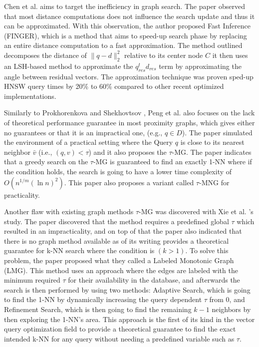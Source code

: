 \documentclass[conference]{IEEEtran}
\begin{document}
Chen et al. \cite{chen2023} aims to target the inefficiency in graph search. The paper observed that most distance computations does not influence the search update and thus it can be approximated. With this observation, the author proposed Fast Inference (FINGER), which is a method that aims to speed-up search phase by replacing an entire distance computation to a fast approximation. The method outlined decomposes the distance of $\|q-d\|_2^2$ relative to its center node $C$ it then uses an LSH-based method to approximate the $q_{res}^t d_{res}$ term by approximating the angle between residual vectors. The approximation technique was proven sped-up HNSW query times by 20\% to 60\% compared to other recent optimized implementations.

Similarly to Prokhorenkova and Shekhovtsov \cite{prokhorenkova2020}, Peng et al. \cite{peng2023} also focuses on the lack of theoretical performance guarantee in most proximity graphs, which gives either no guarantees or that it is an impractical one, (e.g., $q \in D$). The paper simulated the environment of a practical setting where the Query $q$ is close to its nearest neighbor $\bar{v}$ (i.e., $(q,v) < \tau$) and it also proposes the $\tau$-MG. The paper indicates that a greedy search on the $\tau$-MG is guaranteed to find an exactly 1-NN where if the condition holds, the search is going to have a lower time complexity of $O(n^{1/m}(\ln n)^2)$. This paper also proposes a variant called $\tau$-MNG for practicality.

Another flaw with existing graph methods $\tau$-MG was discovered with Xie et al. \cite{xie2025}'s study. The paper discovered that the method requires a predefined global $\tau$ which resulted in an impracticality, and on top of that the paper also indicated that there is no graph method available as of its writing provides a theoretical guarantee for k-NN search where the condition is $(k > 1)$. To solve this problem, the paper proposed what they called a Labeled Monotonic Graph (LMG). This method uses an approach where the edges are labeled with the minimum required $\tau$ for their availability in the database, and afterwards the search is then performed by using two methods: Adaptive Search, which is going to find the 1-NN by dynamically increasing the query dependent $\tau$ from 0, and Refinement Search, which is then going to find the remaining $k-1$ neighbors by then exploring the 1-NN's area. This approach is the first of its kind in the vector query optimization field to provide a theoretical guarantee to find the exact intended k-NN for any query without needing a predefined variable such as $\tau$.
\end{document}
